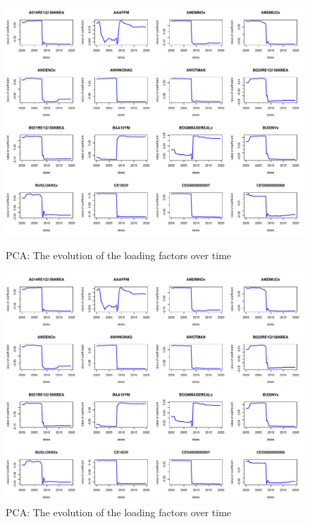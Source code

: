 \documentclass{article}
\begin{document}
\begin{subfigures}
\begin{figure}[hbt!]
\includegraphics[page = 7, width=\textwidth]{plots/pca_loads}
\label{fig:pca_loads}
\caption{\label{seventh}PCA: The evolution of the loading factors over time}
\centering
\end{figure}

\begin{figure}[hbt!]
\includegraphics[page = 8, width=\textwidth]{plots/pca_loads}
\caption{\label{eighth}PCA: The evolution of the loading factors over time}
\label{fig:pca_loads}
\centering
\end{figure}


\end{subfigures}
\end{document}
